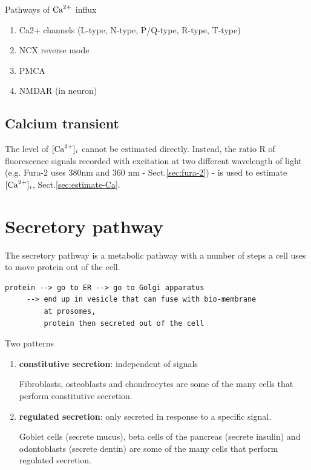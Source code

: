 Pathways of ${\text{Ca}^{2+}}$ influx
\begin{enumerate}
  \item Ca2+ channels (L-type, N-type, P/Q-type, R-type, T-type)
  
  \item NCX reverse mode
  
  \item PMCA 
  
  \item NMDAR (in neuron)
\end{enumerate}

\subsection{Calcium transient}

The level of $[{\text{Ca}^{2+}}]_i$ cannot be estimated directly. Instead, the ratio R of
fluorescence signals recorded with excitation at two different wavelength of
light (e.g. Fura-2 uses 380nm and 360 nm - Sect.\ref{sec:fura-2}) - is used to
estimate $[{\text{Ca}^{2+}}]_i$, Sect.\ref{sec:estimate-Ca}.



\section{Secretory pathway}
\label{sec:secretory-pathway}

The secretory pathway is a metabolic pathway with a number of steps a cell
uses to move protein out of the cell. 
\begin{verbatim}
protein --> go to ER --> go to Golgi apparatus 
     --> end up in vesicle that can fuse with bio-membrane
         at prosomes, 
         protein then secreted out of the cell
\end{verbatim}

Two patterns 
\begin{enumerate}
  \item {\bf constitutive secretion}: independent of signals

Fibroblasts, osteoblasts and chondrocytes are some of the many cells that
  perform constitutive secretion.
  
  \item {\bf regulated secretion}: only secreted in response to a specific
  signal.

Goblet cells (secrete mucus), beta cells of the pancreas (secrete insulin) and
  odontoblasts (secrete dentin) are some of the many cells that perform
  regulated secretion.
\end{enumerate}






